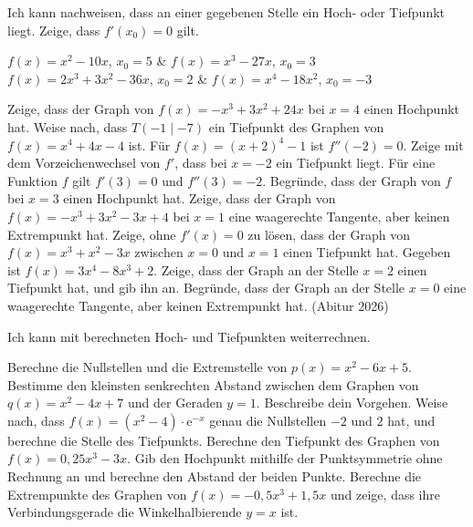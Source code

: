 \begin{aufgabe}{Ich kann nachweisen, dass an einer gegebenen Stelle ein Hoch- oder Tiefpunkt liegt. Zeige, dass $f'(x_0) = 0$ gilt.}
\begin{teilezwei}
\tz $f(x) = x^2 - 10x$, \quad $x_0 = 5$ & \tz $f(x) = x^3 - 27x$, \quad $x_0 = 3$ \\
\tz $f(x) = 2x^3 + 3x^2 - 36x$, \quad $x_0 = 2$ & \tz $f(x) = x^4 - 18x^2$, \quad $x_0 = -3$ \\
\end{teilezwei}
\begin{teile}
\teil Zeige, dass der Graph von $f(x) = -x^3 + 3x^2 + 24x$ bei $x = 4$ einen Hochpunkt hat.
\teil Weise nach, dass $T(-1 \mid -7)$ ein Tiefpunkt des Graphen von $f(x) = x^4 + 4x - 4$ ist.
\teil Für $f(x) = (x + 2)^4 - 1$ ist $f''(-2) = 0$. Zeige mit dem Vorzeichenwechsel von $f'$, dass bei $x = -2$ ein Tiefpunkt liegt.
\teil Für eine Funktion $f$ gilt $f'(3) = 0$ und $f''(3) = -2$. Begründe, dass der Graph von $f$ bei $x = 3$ einen Hochpunkt hat.
\teil Zeige, dass der Graph von $f(x) = -x^3 + 3x^2 - 3x + 4$ bei $x = 1$ eine waagerechte Tangente, aber keinen Extrempunkt hat.
\teil Zeige, ohne $f'(x) = 0$ zu lösen, dass der Graph von $f(x) = x^3 + x^2 - 3x$ zwischen $x = 0$ und $x = 1$ einen Tiefpunkt hat.
\teil Gegeben ist $f(x) = 3x^4 - 8x^3 + 2$. Zeige, dass der Graph an der Stelle $x = 2$ einen Tiefpunkt hat, und gib ihn an. Begründe, dass der Graph an der Stelle $x = 0$ eine waagerechte Tangente, aber keinen Extrempunkt hat. (Abitur 2026)
\end{teile}
\end{aufgabe}

\begin{aufgabe}{Ich kann mit berechneten Hoch- und Tiefpunkten weiterrechnen.}
\begin{teile}
\teil Berechne die Nullstellen und die Extremstelle von $p(x) = x^2 - 6x + 5$.
\teil Bestimme den kleinsten senkrechten Abstand zwischen dem Graphen von $q(x) = x^2 - 4x + 7$ und der Geraden $y = 1$. Beschreibe dein Vorgehen.
\teil Weise nach, dass $f(x) = (x^2 - 4)\cdot\mathrm{e}^{-x}$ genau die Nullstellen $-2$ und $2$ hat, und berechne die Stelle des Tiefpunkts.
\teil Berechne den Tiefpunkt des Graphen von $f(x) = 0{,}25x^3 - 3x$. Gib den Hochpunkt mithilfe der Punktsymmetrie ohne Rechnung an und berechne den Abstand der beiden Punkte.
\teil Berechne die Extrempunkte des Graphen von $f(x) = -0{,}5x^3 + 1{,}5x$ und zeige, dass ihre Verbindungsgerade die Winkelhalbierende $y = x$ ist.
\end{teile}
\end{aufgabe}

